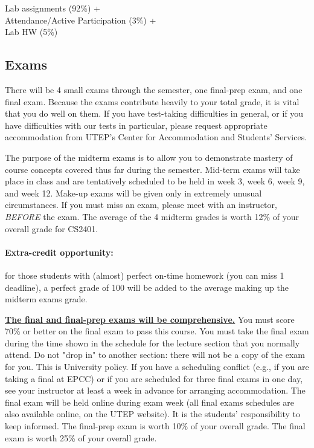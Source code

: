 \documentclass[12pt]{scrartcl}
\begin{document}
\begin{tcolorbox}[colback=blue!5,colframe=blue!75!black,title=Lab Grade]
\begin{center}

Lab assignments (92\%) + \\
Attendance/Active Participation (3\%) +\\
Lab HW (5\%)
\end{center}

\end{tcolorbox}

\subsection{Exams}
There will be 4 small exams through the semester, one final-prep exam, and one final exam. 
Because the exams contribute heavily to your total grade, it is vital that you do well on them. 
If you have test-taking difficulties in general, or if you have difficulties with our tests in particular, please request appropriate accommodation from UTEP’s Center for Accommodation and Students’ Services.

The purpose of the midterm exams is to allow you to demonstrate mastery of course concepts covered thus far during the semester. 
Mid-term exams will take place 
in class 
and are tentatively scheduled to be held in week 3, week 6, week 9, and week 12. 
Make-up exams will be given only in extremely unusual circumstances. 
If you must miss an exam, please meet with an instructor, \textit{BEFORE} the exam. 
The average of the 4 midterm grades is worth 12\% of your overall grade for CS2401.
 
\paragraph{Extra-credit opportunity:} 
for those students with (almost) perfect on-time homework (you can miss 1 deadline), a perfect grade of 100 will be added to the average making up the midterm exams grade.

\textbf{\underline{The final and final-prep exams will be comprehensive.}}
You must score 70\% or better on the final exam to pass this course. 
You must take the final exam during the time shown in the schedule for the lecture section that you normally attend. 
Do not "drop in" to another section: there will not be a copy of the exam for you. 
This is University policy. If you have a scheduling conflict (e.g., if you are taking a final at EPCC) or if you are scheduled for three final exams in one day, see your instructor at least a week in advance for arranging accommodation.
 The final exam will be held online during exam week (all final exams schedules are also available online, on the UTEP website). 
 It is the students’ responsibility to keep informed.  The final-prep exam is worth 10\% of your overall grade. The final exam is worth 25\% of your overall grade. 
\end{document}
